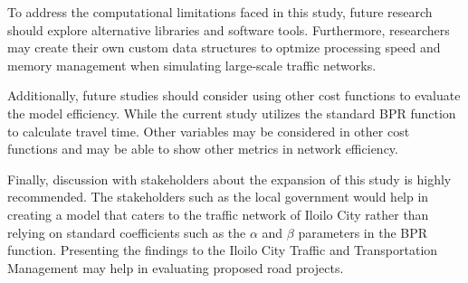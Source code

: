 To address the computational limitations faced in this study, future research should explore alternative libraries and software tools. Furthermore, researchers may create their own custom data structures to optmize processing speed and memory management when simulating large-scale traffic networks. 

Additionally, future studies should consider using other cost functions to evaluate the model efficiency. While the current study utilizes the standard BPR function to calculate travel time. Other variables may be considered in other cost functions and may be able to show other metrics in network efficiency.

Finally, discussion with stakeholders about the expansion of this study is highly recommended. The stakeholders such as the local government would help in creating a model that caters to the traffic network of Iloilo City rather than relying on standard coefficients such as the $\alpha$ and $\beta$ parameters in the BPR function. Presenting the findings to the Iloilo City Traffic and Transportation Management may help in evaluating proposed road projects.